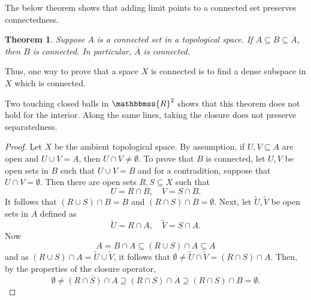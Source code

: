 \documentclass[12pt]{article}
\newcommand{\R}{\mathbbmss{R}}
\newtheorem{thm}{Theorem}
\begin{document}
The below theorem shows that adding limit points to a connected 
set preserves  connectedness. 

\begin{thm} Suppose $A$ is a connected set in a topological space. 
If $A\subseteq B \subseteq \overline{A}$, then $B$ is connected.
     In particular, $\overline{A}$ is connected.
\end{thm}

Thus, on{e} wa{y} to prove that a space $X$ is connected is to find a dense
subspace in $X$ which is connected.

Two touching closed balls in $\R^2$ shows that this theorem does not hold
for the interior. Along the same lines, taking the closure does not
preserve separatedness.

\begin{proof} Let $X$ be the ambient topological space. 
By assumption, if $U,V\subseteq A$ are open and $U\cup V=A$, then 
$U\cap V\neq \emptyset$. 
To prove that $B$ is connected, let $U,V$ be open sets in 
$B$ such that $U\cup V = B$ and for a
contradition, suppose that $U\cap V=\emptyset$. 
Then there are open sets $R,S\subseteq X$ such that 
$$
   U= R\cap B, \quad V= S\cap B.
$$
It follows that $(R\cup S) \cap B=B$
  and $(R\cap S)\cap B=\emptyset$. 
Next, let $\tilde{U}, \tilde{V}$ be open sets in $A$ defined as
$$
   \tilde{U}= R\cap A, \quad \tilde{V}= S\cap A.
$$
Now 
$$
  A= B\cap A \subseteq (R\cup S)\cap A \subseteq A
$$
and as $ (R\cup S)\cap A = \tilde{U}\cup \tilde{V}$, it follows that
$\emptyset \neq \tilde{U}\cap \tilde{V} = (R\cap S) \cap A$. 
Then, by the properties of the closure operator, 
$$
  \emptyset \neq \overline{(R\cap S)\cap A} \supseteq (R\cap S)\cap \overline{A} \supseteq (R\cap S)\cap B = \emptyset.
$$
\end{proof}
\end{document}
